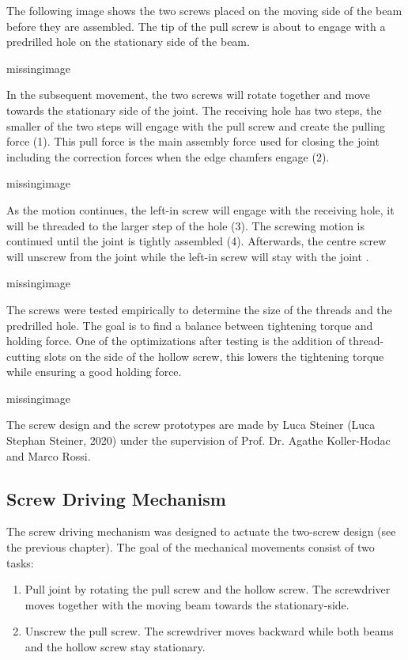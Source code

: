 The following image shows the two screws placed on the moving side of the beam before they are assembled. The tip of the pull screw is about to engage with a predrilled hole on the stationary side of the beam.

missingimage

In the subsequent movement, the two screws will rotate together and move towards the stationary side of the joint. The receiving hole has two steps, the smaller of the two steps will engage with the pull screw and create the pulling force (1). This pull force is the main assembly force used for closing the joint including the correction forces when the edge chamfers engage (2).

missingimage


As the motion continues, the left-in screw will engage with the receiving hole, it will be threaded to the larger step of the hole (3). The screwing motion is continued until the joint is tightly assembled (4). Afterwards, the centre screw will unscrew from the joint while the left-in screw will stay with the joint .

missingimage

The screws were tested empirically to determine the size of the threads and the predrilled hole. The goal is to find a balance between tightening torque and holding force. One of the optimizations after testing is the addition of thread-cutting slots on the side of the hollow screw, this lowers the tightening torque while ensuring a good holding force.

missingimage

The screw design and the screw prototypes are made by Luca Steiner (Luca Stephan Steiner, 2020) under the supervision of Prof. Dr. Agathe Koller-Hodac and Marco Rossi.

\subsection{Screw Driving Mechanism}
\label{subsection:exploration_4_screw_driving_mechanism}

The screw driving mechanism was designed to actuate the two-screw design (see the previous chapter). The goal of the mechanical movements consist of two tasks:

\begin{enumerate}
    \item Pull joint by rotating the pull screw and the hollow screw. The screwdriver moves together with the moving beam towards the stationary-side.
    \item Unscrew the pull screw. The screwdriver moves backward while both beams and the hollow screw stay stationary.
\end{enumerate}

